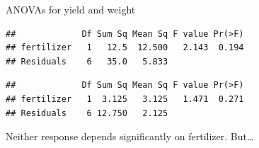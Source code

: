 \begin{frame}[fragile]{ANOVAs for yield and weight}

{\small
 
\begin{knitrout}
\color{fgcolor}\begin{kframe}
\begin{alltt}
\hlkwb{=}\hlopt{~}
\end{alltt}
\begin{verbatim}
##             Df Sum Sq Mean Sq F value Pr(>F)
## fertilizer   1   12.5  12.500   2.143  0.194
## Residuals    6   35.0   5.833
\end{verbatim}
\begin{alltt}
\hlkwb{=}\hlopt{~}
\end{alltt}
\begin{verbatim}
##             Df Sum Sq Mean Sq F value Pr(>F)
## fertilizer   1  3.125   3.125   1.471  0.271
## Residuals    6 12.750   2.125
\end{verbatim}
\end{kframe}
\end{knitrout}
}

Neither response depends significantly on fertilizer. But\ldots
  
\end{frame}

